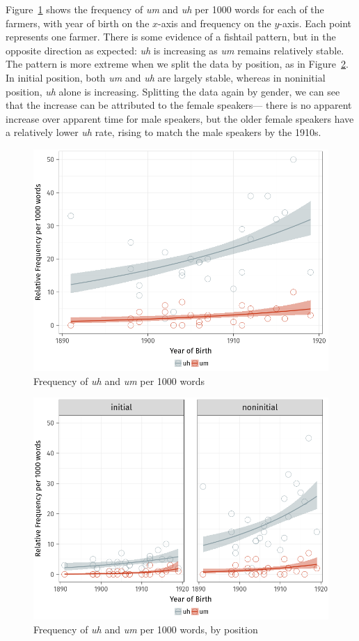 \documentclass[11pt]{article}
\begin{document}
Figure~\ref{fig:relfreq} shows the frequency of \emph{um} and \emph{uh} per 1000
words for each of the farmers, with year of birth on the $x$-axis and frequency
on the $y$-axis.
Each point represents one farmer.
There is some evidence of a fishtail pattern, but in the opposite direction as
expected: \emph{uh} is increasing as \emph{um} remains relatively stable.
The pattern is more extreme when we split the data by position, as in
Figure~\ref{fig:relfreqposition}.
In initial position, both \emph{um} and \emph{uh} are largely stable, whereas in
noninitial position, \emph{uh} alone is increasing.
Splitting the data again by gender, we can see that the increase can be
attributed to the female speakers---%
there is no apparent increase over apparent time for male speakers,
but the older female speakers have a relatively lower \emph{uh} rate, rising to
match the male speakers by the 1910s.

\begin{figure}[htpb]
    \centering
    \includegraphics[width=0.8\linewidth]{figures/relfreq.png}
    \caption{Frequency of \emph{uh} and \emph{um} per 1000 words}%
    \label{fig:relfreq}
\end{figure}

\begin{figure}[htpb]
    \centering
    \includegraphics[width=0.8\linewidth]{figures/relfreqposition.png}
    \caption{Frequency of \emph{uh} and \emph{um} per 1000 words, by position}%
    \label{fig:relfreqposition}
\end{figure}
\end{document}

